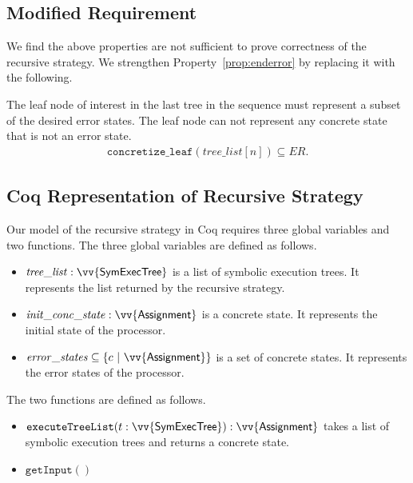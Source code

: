 \subsection{Modified Requirement}
We find the above properties are not sufficient to prove correctness of the
recursive strategy. We strengthen Property~\ref{prop:enderror} by replacing it with the following.

\setcounter{property}{1}
\renewcommand{\theproperty}{Z.\arabic{property}'} 
\begin{property}
  The leaf node of interest in the last tree in the
  sequence must represent a subset of the desired error states. The leaf node
  can not represent any concrete state that is not an error state.
  \label{prop:correctedz2}
  \begin{align*}
    \mathtt{concretize\_leaf}(\mathit{tree\_list}[n]) \subseteq \mathit{ER}.
  \end{align*}

 \end{property}
 
 
\subsection{Coq Representation of Recursive Strategy}
Our model of the recursive strategy in Coq requires three global variables
and two functions. The three global variables are defined as follows.

\begin{itemize}
\item $\mathit{tree\_list} : \vv{\textsf{SymExecTree}}$ is a list of symbolic
  execution trees. It represents the list returned by the recursive strategy.
\item $\mathit{init\_conc\_state} : \vv{\textsf{Assignment}}$ is a concrete
  state. It represents the initial state of the processor.
\item $\mathit{error\_states} \subseteq \{\concstate ~|~
  \vv{\textsf{Assignment}}\}$ is a set of concrete states. It represents the
  error states of the processor.
\end{itemize}

The two functions are defined as follows.
\begin{itemize}
\item $\mathtt{executeTreeList}(t : \vv{\textsf{SymExecTree}}) :
  \vv{\textsf{Assignment}}$ takes a list of symbolic execution trees and
  returns a concrete state.
\item $\mathtt{getInput}()$ 
\end{itemize}
  
